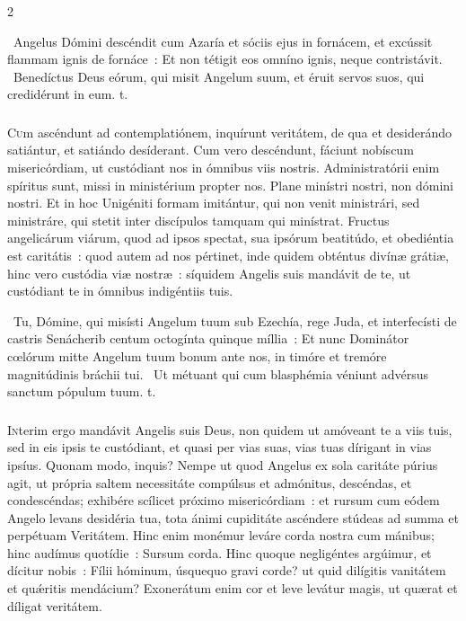 \documentclass[9pt,twoside]{extarticle}
\begin{document}
\begin{multicols}{2}
{{{\begin{tightlist}{}
\item {}~Angelus Dómini descéndit cum Azaría et sóciis ejus in fornácem, et excússit flammam ignis de fornáce~: \textred{*} Et non tétigit eos omníno ignis, neque contristávit. ~Benedíctus Deus eórum, qui misit Angelum suum, et éruit servos suos, qui credidérunt in eum. t.
\end{tightlist}

\subsubsection*{\center {}}
\lettrine{C}um ascéndunt ad contemplatiónem, inquírunt veritátem, de qua et desiderándo satiántur, et satiándo desíderant. Cum vero descéndunt, fáciunt nobíscum misericórdiam, ut custódiant nos in ómnibus viis nostris. Administratórii enim spíritus sunt, missi in ministérium propter nos. Plane minístri nostri, non dómini nostri. Et in hoc Unigéniti formam imitántur, qui non venit ministrári, sed ministráre, qui stetit inter discípulos tamquam qui minístrat. Fructus angelicárum viárum, quod ad ipsos spectat, sua ipsórum beatitúdo, et obediéntia est caritátis~: quod autem ad nos pértinet, inde quidem obténtus divínæ grátiæ, hinc vero custódia viæ nostræ~: síquidem Angelis suis mandávit de te, ut custódiant te in ómnibus indigéntiis tuis.

\begin{tightlist}{}
\item {}~Tu, Dómine, qui misísti Angelum tuum sub Ezechía, rege Juda, et interfecísti de castris Senácherib centum octogínta quinque míllia~: \textred{*} Et nunc Dominátor cœlórum mitte Angelum tuum bonum ante nos, in timóre et tremóre magnitúdinis bráchii tui. ~Ut métuant qui cum blasphémia véniunt advérsus sanctum pópulum tuum. t.
\end{tightlist}

\subsubsection*{\center {}}
\lettrine{I}nterim ergo mandávit Angelis suis Deus, non quidem ut amóveant te a viis tuis, sed in eis ipsis te custódiant, et quasi per vias suas, vias tuas dírigant in vias ipsíus. Quonam modo, inquis? Nempe ut quod Angelus ex sola caritáte púrius agit, ut própria saltem necessitáte compúlsus et admónitus, descéndas, et condescéndas; exhibére scílicet próximo misericórdiam~: et rursum cum eódem Angelo levans desidéria tua, tota ánimi cupiditáte ascéndere stúdeas ad summa et perpétuam Veritátem. Hinc enim monémur leváre corda nostra cum mánibus; hinc audímus quotídie~: Sursum corda. Hinc quoque negligéntes argúimur, et dícitur nobis~: Fílii hóminum, úsquequo gravi corde? ut quid dilígitis vanitátem et quǽritis mendácium? Exonerátum enim cor et leve levátur magis, ut quærat et díligat veritátem.

}}}
\end{multicols}
\end{document}
